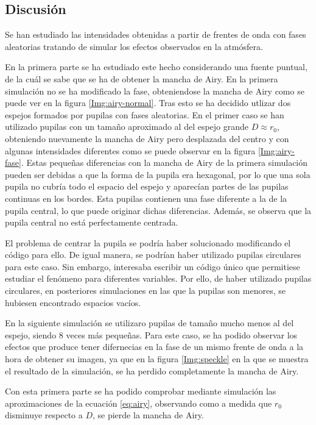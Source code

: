 \documentclass[twoside]{article}
\begin{document}
				\begin{multicols}{2}
		
		\section{Discusión}

			Se han estudiado las intensidades obtenidas a partir de frentes de onda con fases aleatorias tratando de simular los efectos observados en la atmósfera. 

			En la primera parte se ha estudiado este hecho considerando una fuente puntual, de la cuál se sabe que se ha de obtener la mancha de Airy. En la primera simulación no se ha modificado la fase, obteniendose la mancha de Airy como se puede ver en la figura \ref{Img:airy-normal}. Tras esto se ha decidido utlizar dos espejos formados por pupilas con fases aleatorias. En el primer caso se han utilizado pupilas con un tamaño aproximado al del espejo grande $D \approx r_0$, obteniendo nuevamente la mancha de Airy pero desplazada del centro y con algunas intensidades diferentes como se puede observar en la figura \ref{Img:airy-fase}. Estas pequeñas diferencias con la mancha de Airy de la primera simulación pueden ser debidas a que la forma de la pupila era hexagonal, por lo que una sola pupila no cubría todo el espacio del espejo y aparecían partes de las pupilas continuas en los bordes. Esta pupilas contienen una fase diferente a la de la pupila central, lo que puede originar dichas diferencias. Además, se observa que la pupila central no está perfectamente centrada. 

			El problema de centrar la pupila se podría haber solucionado modificando el código para ello. De igual manera, se podrían haber utilizado pupilas circulares para este caso. Sin embargo, interesaba escribir un código único que permitiese estudiar el fenómeno para diferentes variables. Por ello, de haber utilizado pupilas circulares, en posteriores simulaciones en las que la pupilas son menores, se hubiesen encontrado espacios vacíos.

			En la siguiente simulación se utilizaro  pupilas de tamaño mucho menos al del espejo, siendo 8 veces más pequeñas. Para este caso, se ha podido observar los efectos que produce tener difernecias en la fase de un mismo frente de onda a la hora de obtener su imagen, ya que en la figura \ref{Img:speckle} en la que se muestra el resultado de la simulación, se ha perdido completamente la mancha de Airy.

			Con esta primera parte se ha podido comprobar mediante simulación las aproximaciones de la ecuación \ref{eq:airy}, observando como a medida que $r_0$ disminuye respecto a $D$, se pierde la mancha de Airy.


\end{multicols}
\end{document}
